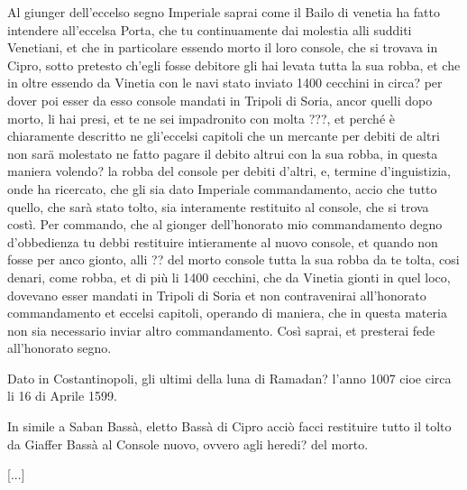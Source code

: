 

\setcounter{allnumber}{2}


Al  giunger  dell'eccelso segno  Imperiale  saprai  come  il Bailo  di
venetia ha fatto intendere all'eccelsa Porta, che tu continuamente dai
molestia alli  sudditi Venetiani, et che in  particolare essendo morto
il loro console, che si trovava in Cipro, sotto pretesto ch'egli fosse
debitore gli hai levata tutta la sua robba, et che in oltre essendo da
Vinetia con  le navi stato inviato  1400 cecchini in  circa? per dover
poi esser  da esso console mandati  in Tripoli di  Soria, ancor quelli
dopo morto, li  hai presi, et te ne sei impadronito  con molta ???, et
perché è chiaramente descritto ne gli'eccelsi capitoli che un mercante
per  debiti de  altri non  sarä molestato  ne fatto  pagare  il debito
altrui  con la sua  robba, in  questa maniera  volendo?  la  robba del
console  per  debiti  d'altri,   e,  termine  d'inguistizia,  onde  ha
ricercato, che  gli sia dato Imperiale commandamento,  accio che tutto
quello, che  sarà stato tolto, sia interamente  restituito al console,
che si  trova costì.  Per  commando, che al gionger  dell'honorato mio
commandamento degno  d'obbedienza tu debbi  restituire intieramente al
nuovo console, et quando non fosse  per anco gionto, alli ?? del morto
console tutta la sua robba da te tolta, cosi denari, come robba, et di
più li  1400 cecchini,  che da Vinetia  gionti in quel  loco, dovevano
esser mandati  in Tripoli di  Soria et non  contravenirai all'honorato
commandamento et eccelsi capitoli,  operando di maniera, che in questa
materia non sia necessario inviar altro commandamento. Così saprai, et
presterai fede all'honorato segno.

Dato in Costantinopoli, gli ultimi  della luna di Ramadan? l'anno 1007
cioe circa li 16 di Aprile 1599.

In simile a Saban Bassà,  eletto Bassà di Cipro acciò facci restituire
tutto il tolto da Giaffer  Bassà al Console nuovo, ovvero agli heredi?
del morto.

\setcounter{docnumber}{10}


\tuttocifrato

[...]

